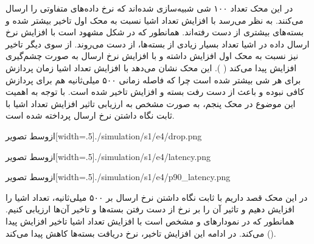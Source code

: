 در این محک تعداد ۱۰۰ شی شبیه‌سازی شده‌اند که نرخ داده‌های متفاوتی را ارسال می‌کنند. به نظر می‌رسد با افزایش تعداد اشیا نسبت به محک‌ اول تاخیر بیشتر شده و بسته‌های بیشتری
از دست رفته‌اند. همانطور که در شکل  مشهود است با افزایش نرخ ارسال داده در اشیا
تعداد بسیار زیادی از بسته‌ها، از دست می‌روند.
از سوی دیگر تاخیر نیز نسبت به محک اول افزایش داشته و با افزایش نرخ ارسال به صورت چشم‌گیری افزایش پیدا می‌کند
( ).
این محک نشان می‌دهد با افزایش تعداد اشیا زمان پردازش برای هر شی بیشتر شده است چرا که فاصله زمانی ۵۰۰ میلی‌ثانیه هم برای پردازش کافی نبوده و باعث از دست رفت بسته و
افزایش تاخیر شده است. با توجه به اهمیت این موضوع در محک پنجم، به صورت مشخص به ارزیابی تاثیر افزایش تعداد اشیا با ثابت نگاه داشتن نرخ ارسال پرداخته شده است.

‌ازوسط
‌تصویر[width=.5\textwidth]{./simulation/s1/e4/drop.png}

‌ازوسط
‌تصویر[width=.5\textwidth]{./simulation/s1/e4/latency.png}

‌ازوسط
‌تصویر[width=.5\textwidth]{./simulation/s1/e4/p90_latency.png}



در این محک قصد داریم با ثابت نگاه داشتن نرخ ارسال بر ۵۰۰ میلی‌ثانیه، تعداد اشیا را افزایش دهیم و تاثیر آن را بر نرخ از دست رفتن بسته‌ها و تاخیر آن‌ها ارزیابی کنیم.
همانطور که در نمودارهای 
و  مشخص است با افزایش تعداد اشیا تاخیر افزایش پیدا می‌کند.
در ادامه این افزایش تاخیر، نرخ دریافت بسته‌ها کاهش پیدا می‌کند ().

